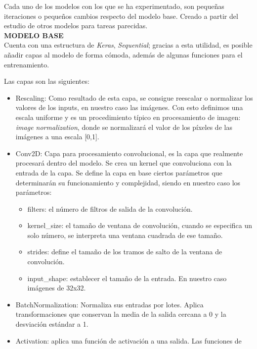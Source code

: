 {\color{migris} Cada uno de los modelos con los que se ha experimentado, son
pequeñas iteraciones o pequeños cambios respecto del modelo base. Creado a partir
del estudio de otros modelos para tareas parecidas.\\

\textbf{MODELO BASE}\\
Cuenta con una estructura de \textit{Keras}, \textit{Sequential}\textsuperscript{\cite{sequential}};
gracias a esta utilidad, es posible añadir capas al modelo de forma cómoda, además
de algunas funciones para el entrenamiento.

Las capas son las siguientes:
\begin{itemize}
    \itemsep0em 
    \item Rescaling\textsuperscript{\cite{rescaling}}: Como resultado de esta capa,
    se consigue reescalar o normalizar
    los valores de los inputs, en nuestro caso las imágenes. Con esto definimos
    una escala uniforme y es un procedimiento típico en procesamiento de imagen:
    \textit{image normalization}, donde se normalizará el valor de los píxeles
    de las imágenes a una escala [0,1].
    \item Conv2D\textsuperscript{\cite{conv2d}}: Capa para procesamiento convolucional,
    es la capa que realmente
    procesará dentro del modelo. Se crea un kernel que convoluciona con la entrada
    de la capa. Se define la capa en base ciertos parámetros que determinarán su
    funcionamiento y complejidad, siendo en nuestro caso los parámetros:
    \begin{itemize}
        \itemsep0em 
        \item filters: el número de filtros de salida de la convolución.
        \item kernel\_size: el tamaño de ventana de convolución, cuando se
        especifica un solo número, se interpreta una ventana cuadrada de ese
        tamaño.
        \item strides: define el tamaño de los tramos de salto de la ventana
        de convolución.
        \item input\_shape: establecer el tamaño de la entrada. En nuestro caso
        imágenes de 32x32.
    \end{itemize}
    \item BatchNormalization\textsuperscript{\cite{bnorm}}: Normaliza sus entradas por lotes.
    Aplica transformaciones
    que conservan la media de la salida cercana a 0 y la desviación estándar a 1.
    \item Activation\textsuperscript{\cite{activation}}: aplica una función de activación a una salida. Las funciones de

\end{itemize}}
